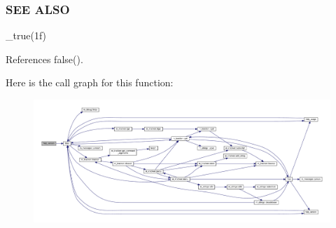 \subsubsection*{S\+EE A\+L\+SO}

\+\_\+true(1f) 

References false().

Here is the call graph for this function\+:
\nopagebreak
\begin{figure}[H]
\begin{center}
\leavevmode
\includegraphics[width=350pt]{__false_8f90_a39c21619b08a3c22f19e2306efd7f766_cgraph}
\end{center}
\end{figure}
